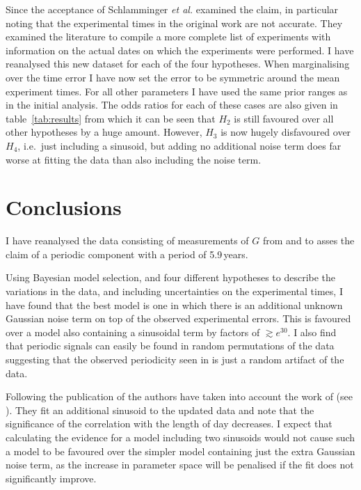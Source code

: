 \documentclass[doublecol]{epl2}
\begin{document}
Since the acceptance of \cite{2015EL....11010002A} Schlamminger {\it et al.} \cite{2015arXiv150501774S}
examined the claim, in particular noting that the experimental times in the original work
are not accurate. They examined the literature to compile a more complete list of
experiments with information on the actual dates on which the experiments were performed.
I have reanalysed this new dataset for each of the four hypotheses. When marginalising over the
time error I have now set the error to be symmetric around the mean experiment times.
For all other parameters I have used the same prior ranges as in the initial analysis.
The odds ratios for each of these cases are also given in table~\ref{tab:results} from which it can
be seen that $H_2$ is still favoured over all other hypotheses by a huge amount. However, $H_3$
is now hugely disfavoured over $H_4$, i.e.\ just including a sinusoid, but adding no additional noise
term does far worse at fitting the data than also including the noise term.

\section{Conclusions}

I have reanalysed the data consisting of measurements of $G$ from
\cite{2015EL....11010002A} and \cite{2015arXiv150501774S} to asses the claim of a periodic
component with a period of 5.9\,years.

Using Bayesian model selection, and four different hypotheses to describe the variations in the data, and including
uncertainties on the experimental times, I have found that the best model is one in which
there is an additional unknown Gaussian noise term on top of the observed experimental errors. This is 
favoured over a model also containing a sinusoidal term by factors of $\gtrsim e^{30}$. I also find that periodic
signals can easily be found in random permutations of the data suggesting that the observed periodicity seen in
\cite{2015EL....11010002A} is just a random artifact of the data.

Following the publication of \cite{2015EL....11010002A} the authors have taken into account the work of \cite{2015arXiv150501774S} (see \cite{AndersonRevised}). They fit an additional
sinusoid to the updated data and note that the significance of the correlation with the length of day decreases. 
I expect that calculating the evidence for a model including two sinusoids would not cause such a model to be
favoured over the simpler model containing just the
extra Gaussian noise term, as the increase in parameter space will be penalised if the fit does not 
significantly improve.
\end{document}
